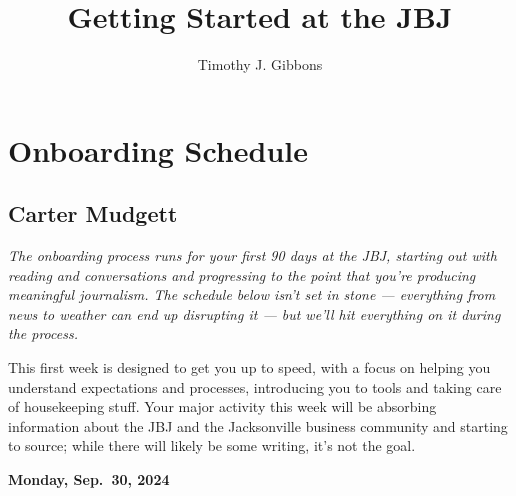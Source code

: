 \documentclass[
  11pt,
  american,
  letterpaperpaper,
  extrafontsizes,onecolumn,openright
  ]{memoir}
\title{Getting Started at the JBJ}
\author{Timothy J. Gibbons}
\date{}
\makeatletter
\newcommand{\MemoirChapStyle}{daleif1}
\newcommand{\MemoirPageStyle}{Ruled}
\newlength\widthw %
\newcommand*{\SmallMargins}{
  \setlrmarginsandblock{1.5in}{1.5in}{*}
  \setmarginnotes{0.1in}{0.1in}{0.1in}
 \setulmarginsandblock{1.5in}{1in}{*}
  \checkandfixthelayout
  \ch@ngetext
  \clearpage
  \setlength{\widthw}{\textwidth+\marginparsep+\marginparwidth}
  \footnotesatfoot
  \chapterstyle{\MemoirChapStyle}  %
  \pagestyle{\MemoirPageStyle}
}
\newcommand{\LargeMargins}{\SmallMargins}
\makeatother
\begin{document}
\frontmatter



\cleardoublepage









\LargeMargins
{
\hypersetup{linkcolor=}
\setcounter{tocdepth}{0}
\tableofcontents
}



\LargeMargins
\hypertarget{onboarding-schedule}{%
\chapter*{Onboarding Schedule}\label{onboarding-schedule}}

\hypertarget{carter-mudgett}{%
\section*{Carter Mudgett}\label{carter-mudgett}}

\emph{The onboarding process runs for your first 90 days at the JBJ, starting out with reading and conversations and progressing to the point that you're producing meaningful journalism. The schedule below isn't set in stone --- everything from news to weather can end up disrupting it --- but we'll hit everything on it during the process.}

\leavevmode{}%
\begin{greybox}[frametitle=Onboarding Path - Week 1]
This first week is designed to get you up to speed, with a focus on helping you understand expectations and processes, introducing you to tools and taking care of housekeeping stuff. Your major activity this week will be absorbing information about the JBJ and the Jacksonville business community and starting to source; while there will likely be some writing, it's not the goal.

\end{greybox}

\textbf{Monday, Sep.~30, 2024}
\end{document}
